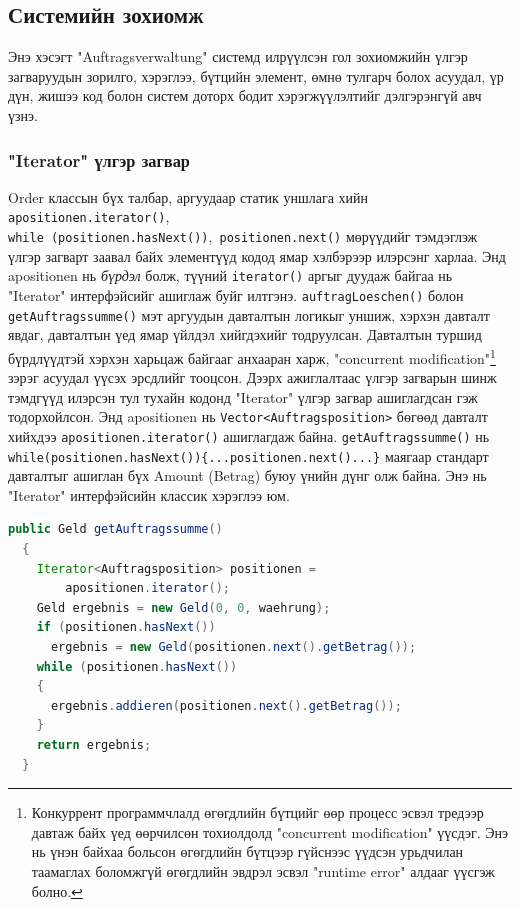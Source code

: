 \subsection{Системийн зохиомж}
Энэ хэсэгт "Auftragsverwaltung" системд илрүүлсэн гол зохиомжийн үлгэр загваруудын зорилго, хэрэглээ, бүтцийн элемент, өмнө тулгарч болох асуудал, үр дүн, жишээ код болон систем доторх бодит хэрэгжүүлэлтийг дэлгэрэнгүй авч үзнэ.

\subsubsection{"Iterator" үлгэр загвар}
Order классын бүх талбар, аргуудаар статик уншлага хийн \verb|apositionen.iterator()|,\\ \verb|while (positionen.hasNext())|,\verb| positionen.next()| мөрүүдийг тэмдэглэж үлгэр загварт заавал байх элементүүд кодод ямар хэлбэрээр илэрсэнг харлаа. Энд apositionen нь \textit{бүрдэл} болж, түүний \verb|iterator()| аргыг дуудаж байгаа нь "Iterator" интерфэйсийг ашиглаж буйг илтгэнэ. \verb|auftragLoeschen()| болон \verb|getAuftragssumme()| мэт аргуудын давталтын логикыг уншиж, хэрхэн давталт явдаг, давталтын үед ямар үйлдэл хийгдэхийг тодруулсан. Давталтын туршид бүрдлүүдтэй хэрхэн харьцаж байгааг анхааран харж, "concurrent modification"\footnote{Конкуррент программчлалд өгөгдлийн бүтцийг өөр процесс эсвэл тредээр давтаж байх үед өөрчилсөн тохиолдолд "concurrent modification" үүсдэг. Энэ нь үнэн байхаа больсон өгөгдлийн бүтцээр гүйснээс үүдсэн урьдчилан таамаглах боломжгүй өгөгдлийн эвдрэл эсвэл "runtime error" алдааг үүсгэж болно.} зэрэг асуудал үүсэх эрсдлийг тооцсон. Дээрх ажиглалтаас үлгэр загварын шинж тэмдгүүд илэрсэн тул тухайн кодонд "Iterator" үлгэр загвар ашиглагдсан гэж тодорхойлсон. Энд apositionen нь \verb|Vector<Auftragsposition>| бөгөөд давталт хийхдээ \verb|apositionen.iterator()| ашиглагдаж байна. \verb|getAuftragssumme()| нь \verb|while(positionen.hasNext()){...positionen.next()...}| маягаар стандарт давталтыг ашиглан бүх Amount (Betrag) буюу үнийн дүнг олж байна. Энэ нь "Iterator" интерфэйсийн классик хэрэглээ юм.

\begin{lstlisting}[language=Java, caption=Order классын арга getAuftragssumme, frame=single]
  public Geld getAuftragssumme()
  {
    Iterator<Auftragsposition> positionen =
        apositionen.iterator();
    Geld ergebnis = new Geld(0, 0, waehrung);
    if (positionen.hasNext())
      ergebnis = new Geld(positionen.next().getBetrag());
    while (positionen.hasNext())
    {
      ergebnis.addieren(positionen.next().getBetrag());
    }
    return ergebnis;
  }
\end{lstlisting}

